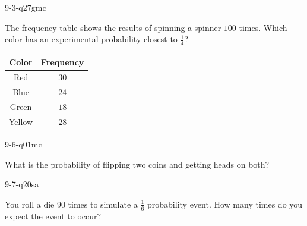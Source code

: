 \begin{practiceQuestion}{9-3-q27}{gmc}
\begin{questionText}
The frequency table shows the results of spinning a spinner $100$ times. Which color has an experimental probability closest to $\frac{1}{4}$?

\begin{center}
\begin{tabular}{|c|c|}
\hline
\textbf{Color} & \textbf{Frequency} \\
\hline
Red & $30$ \\
\hline
Blue & $24$ \\
\hline
Green & $18$ \\
\hline
Yellow & $28$ \\
\hline
\end{tabular}
\end{center}
\end{questionText}
\end{practiceQuestion}

\begin{practiceQuestion}{9-6-q01}{mc}
\begin{questionText}
What is the probability of flipping two coins and getting heads on both?
\end{questionText}
\end{practiceQuestion}

\begin{practiceQuestion}{9-7-q20}{sa}
\begin{questionText}
You roll a die $90$ times to simulate a $\frac{1}{6}$ probability event. How many times do you expect the event to occur?
\end{questionText}
\end{practiceQuestion}
